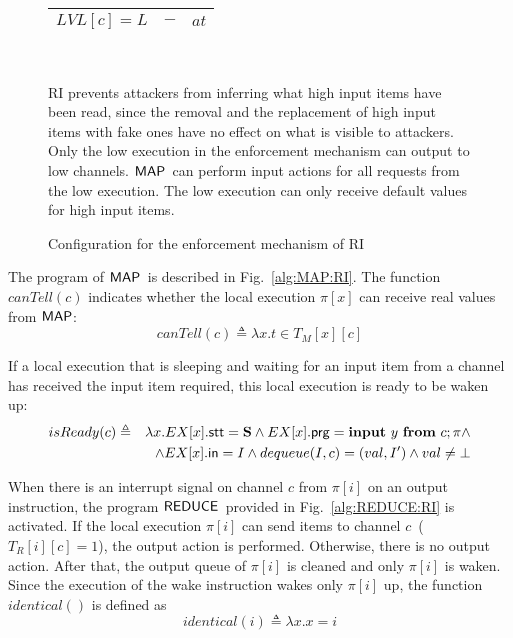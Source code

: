 \documentclass[10pt,a4paper,oneside]{article}
\def\dequeue#1#2{\ensuremath{dequeue(#1, #2)}}
\def\intsig#1{\ensuremath{#1}}
\def\sS{\textbf{S}}
\def\LVL{\ensuremath{LVL}}
\def\TAV{\ensuremath{T_{M}}}
\def\TPV{\ensuremath{T_{R}}}
\def\ST{{\ensuremath{EX}}}
\def\chnl{\ensuremath{c}}
\def\NIL{\ensuremath{\bot}}
\def\sanserif#1{\ensuremath{\sf #1}}
\def\REDUCE{\ensuremath{\sanserif{REDUCE}}}
\def\MAP{\ensuremath{\sanserif{MAP}}}
\def\valueM{\ensuremath{val}}
\def\Prog{\ensuremath{\pi}}
\def\Progl#1{\ensuremath{\Prog[#1]}}
\def\comm{\ensuremath{\pi}}
\def\Iid{\ensuremath{I}}
\def\NCMAP{\ensuremath{canTell}}
\def\NISREADY{\ensuremath{isReady}}
\def\canMap#1{\ensuremath{\NCMAP(#1)}}
\def\isReady#1{\ensuremath{\NISREADY(#1)}}
\def\identical#1{\ensuremath{identical(#1)}}
\def\lprog{{\sf prg}}
\def\linput{{\sf in}}
\def\lstate{{\sf stt}}
\def\tnoaction{\ensuremath{-}}
\def\ttellput{\ensuremath{at}}
\def\ttell{\ensuremath{t}}
\def\figdesc#1{
\noindent
\centering
\begin{minipage}{0.95\columnwidth}
\vspace{3pt}
\begin{footnotesize}
#1
\end{footnotesize}
\end{minipage}
}
\begin{document}
\begin{figure}[!t]
{\begin{tabular}{|c|c|c|}
\hline
$\LVL[\chnl] = L$ & \tnoaction & \ttellput \\
\hline
\end{tabular}
}\\
\figdesc{RI prevents attackers from inferring what high input items have been read, since the removal and the replacement of high input items with fake ones have no effect on what is visible to attackers. Only the low execution in the enforcement mechanism can output to low channels. \MAP\ can perform input actions for all requests from the low execution. The low execution can only receive default values for high input items.}
\caption{Configuration for the enforcement mechanism of RI}
\label{fig:table:RI}
\end{figure}


The program of \MAP\ is described in Fig.~\ref{alg:MAP:RI}. The function $\canMap{c}$ indicates whether the local execution \Progl{x} can receive real values from \MAP:
\begin{equation}  \label{func:canMap}
\canMap{\chnl} \triangleq \lambda x. \ttell \in \TAV[x][\chnl]
\end{equation}

If a local execution that is sleeping and waiting for an input item from a channel has received the input item required, this local execution is ready to be waken up:
\begin{eqnarray}\label{func:isReady}
\isReady{c} & \triangleq & \lambda x. \ST[x].\lstate = \sS \wedge \ST[x].\lprog = \textbf{input}~ y ~\textbf{from}~ c;\comm \wedge \nonumber \\
			& & \wedge \ST[x].\linput = \Iid \wedge \dequeue{\Iid}{\chnl} = (\valueM, I') \wedge  \valueM \neq \NIL
\end{eqnarray}





When there is an interrupt signal on channel \intsig{\chnl} from \Progl{i} on an output instruction, the program \REDUCE\ provided in Fig.~\ref{alg:REDUCE:RI} is activated. If the local execution $\Progl{i}$ can send items to channel \chnl\ ($\TPV[i][\chnl] = 1$), the output action is performed. Otherwise, there is no output action. After that, the output queue of $\Prog[i]$ is cleaned and only $\Progl{i}$ is waken. Since the execution of the wake instruction wakes only \Progl{i} up, the function $\identical{}$ is defined as
\begin{equation} \label{func:identical}
	\identical{i} \triangleq \lambda x. x = i
\end{equation}
\end{document}
